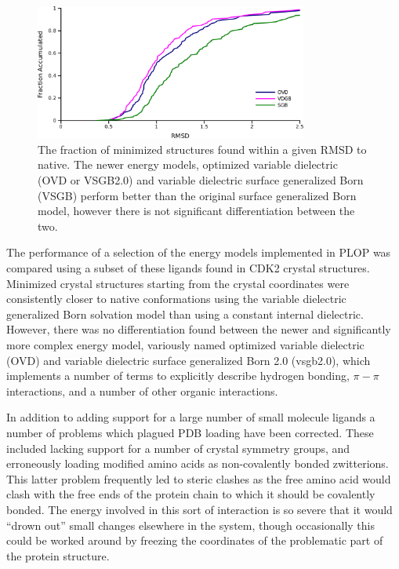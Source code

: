 \begin{figure}[h]
\centering
\includegraphics[width=0.8\textwidth]{figures/small_molecule_minimization.png}
\caption{The fraction of minimized structures found within a given RMSD to native.
The newer energy models, optimized variable dielectric (OVD or VSGB2.0) and variable dielectric surface generalized Born (VSGB) perform better than the original surface generalized Born model, however there is not significant differentiation between the two.}
\label{figure:small_molecule_minimization}
\end{figure}

The performance of a selection of the energy models implemented in PLOP was compared using a subset of these ligands found in CDK2 crystal structures.
Minimized crystal structures starting from the crystal coordinates were consistently closer to native conformations using the variable dielectric generalized Born solvation model than using a constant internal dielectric.
However, there was no differentiation found between the newer and significantly more complex energy model, variously named optimized variable dielectric (OVD) and variable dielectric surface generalized Born 2.0 (vsgb2.0), which implements a number of terms to explicitly describe hydrogen bonding, $\pi-\pi$ interactions, and a number of other organic interactions.

In addition to adding support for a large number of small molecule ligands a number of problems which plagued PDB loading have been corrected.
These included lacking support for a number of crystal symmetry groups, and erroneously loading modified amino acids as non-covalently bonded zwitterions.
This latter problem frequently led to steric clashes as the free amino acid would clash with the free ends of the protein chain to which it should be covalently bonded.
The energy involved in this sort of interaction is so severe that it would ``drown out'' small changes elsewhere in the system, though occasionally this could be worked around by freezing the coordinates of the problematic part of the protein structure.
